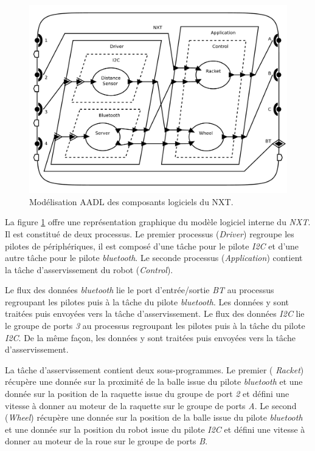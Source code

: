       \begin{figure}[!ht]
        \centering
        \includegraphics[scale=0.25]{./img/aadl-nxt1s.pdf}
        \caption{Modélisation AADL des composants logiciels du NXT.}
        \label{fig:aadl-nxt1s}
      \end{figure}

      La figure \ref{fig:aadl-nxt1s} offre une représentation graphique du
      modèle logiciel interne du {\it NXT}. Il est constitué de deux processus.
      Le premier processus ({\it Driver}) regroupe les pilotes de périphériques,
      il est composé d'une tâche pour le pilote {\it I2C} et d'une autre tâche
      pour le pilote {\it bluetooth}. Le seconde processus ({\it Application})
      contient la tâche d'asservissement du robot ({\it Control}).

      Le flux des données {\it bluetooth} lie le port d'entrée/sortie
      {\it BT} au processus regroupant les pilotes puis à la tâche du
      pilote {\it bluetooth}. Les données y sont traitées puis
      envoyées vers la tâche d'asservissement. Le flux des données
      {\it I2C} lie le groupe de ports {\it 3} au processus regroupant
      les pilotes puis à la tâche du pilote {\it I2C}. De la même
      façon, les données y sont traitées puis envoyées vers la tâche
      d'asservissement.

      La tâche d'asservissement contient deux sous-programmes. Le premier ({\it
        Racket}) récupère une donnée sur la proximité de la balle issue du pilote
      {\it bluetooth} et une donnée sur la position de la raquette issue du
      groupe de port {\it 2} et défini une vitesse à donner au moteur de la
      raquette sur le groupe de ports {\it A}. Le second ({\it Wheel}) récupère
      une donnée sur la position de la balle issue du pilote {\it bluetooth} et
      une donnée sur la position du robot issue du pilote {\it I2C} et défini
      une vitesse à donner au moteur de la roue sur le groupe de ports {\it B}.

